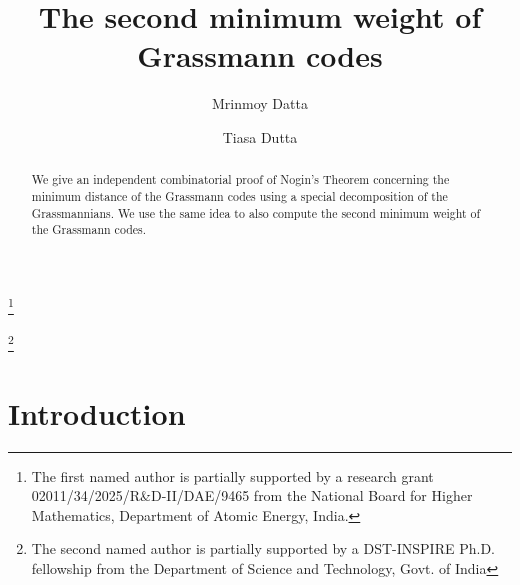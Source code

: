 \documentclass[10pt,a4paper,oneside]{amsproc}
\begin{document}
\title{The second minimum weight of Grassmann codes}  

\author{Mrinmoy Datta}

\address{Department of Mathematics, \newline \indent
Indian Institute of Technology Hyderabad, Kandi, Sangareddy, Telangana, India}
\thanks{The first named author is partially supported by a research grant 02011/34/2025/R\&D-II/DAE/9465 from the National Board for Higher Mathematics, Department of Atomic Energy, India.} %

\author{Tiasa Dutta}

\address{Department of Mathematics, \newline \indent
Indian Institute of Technology Hyderabad, Kandi, Sangareddy, Telangana, India}
\thanks{The second named author is partially supported by a DST-INSPIRE Ph.D. fellowship from the
Department of Science and Technology, Govt. of India}


\date{}
\begin{abstract}   
We give an independent combinatorial proof of Nogin's Theorem concerning the minimum distance of the Grassmann codes using a special decomposition of the Grassmannians. We use the same idea to also compute the second minimum weight of the Grassmann codes. 
\end{abstract}
\maketitle

\section{Introduction}

\end{document}
